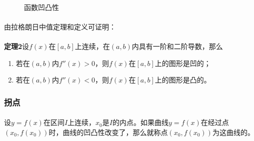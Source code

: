\paragraph{}

\begin{figure}[H]
\centering
  \begin{subfigure}[t]{0.48\linewidth}
    \centering
      
  \end{subfigure}
  \begin{subfigure}[t]{0.48\linewidth}
    \centering
      
  \end{subfigure}
  \begin{subfigure}[t]{0.48\linewidth}
    \centering
      
  \end{subfigure}
  \begin{subfigure}[t]{0.48\linewidth}
    \centering
      
  \end{subfigure}
  \caption{函数凹凸性}
  \label{函数凹凸性}
\end{figure}

\paragraph{}
由拉格朗日中值定理和定义可证明：

\paragraph{}
\textbf{定理2\;}设$f(x)$在$[a,b]$上连续，在$(a,b)$内具有一阶和二阶导数，那么
\begin{enumerate}
  \item 若在$(a,b)$内$f''(x) > 0$，则$f(x)$在$[a,b]$上的图形是凹的；
  \item 若在$(a,b)$内$f''(x) < 0$，则$f(x)$在$[a,b]$上的图形是凸的。
\end{enumerate}

\subsubsection{拐点}
\paragraph{}
设$y=f(x)$在区间$I$上连续，$x_0$是$I$的内点。如果曲线$y=f(x)$在经过点$(x_0,f(x_0))$时，曲线的凹凸性改变了，那么就称点$(x_0,f(x_0))$为这曲线的。

